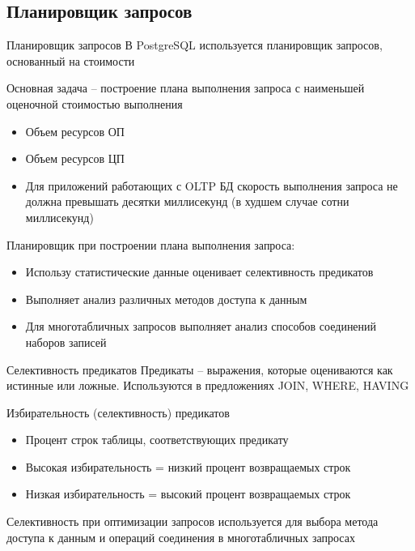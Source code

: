 \documentclass[12pt]{article}
\begin{document}
\newpage

\subsection{Планировщик запросов}

\begin{defin}{Планировщик запросов}
    В PostgreSQL используется планировщик запросов, основанный на стоимости 

    Основная задача -- построение плана выполнения запроса с наименьшей оценочной стоимостью выполнения 

    \begin{itemize}
        \item Объем ресурсов ОП 
        \item Объем ресурсов ЦП
        \item Для приложений работающих с OLTP БД скорость выполнения запроса не должна превышать десятки миллисекунд (в худшем случае сотни миллисекунд)
    \end{itemize}

    Планировщик при построении плана выполнения запроса:

    \begin{itemize}
        \item Использу статистические данные оценивает селективность предикатов 
        \item Выполняет анализ различных методов доступа к данным 
        \item Для многотабличных запросов выполняет анализ способов соединений наборов записей 
    \end{itemize}
\end{defin}

\begin{nota}{Селективность предикатов}
    Предикаты -- выражения, которые оцениваются как истинные или ложные. Используются в предложениях JOIN, WHERE, HAVING 

    Избирательность (селективность) предикатов 

    \begin{itemize}
        \item Процент строк таблицы, соответствующих предикату 
        \item Высокая избирательность = низкий процент возвращаемых строк 
        \item Низкая избирательность = высокий процент возвращаемых строк
    \end{itemize}

    Селективность при оптимизации запросов используется для выбора метода доступа к данным и операций соединения в многотабличных запросах 
\end{nota}
\end{document}
